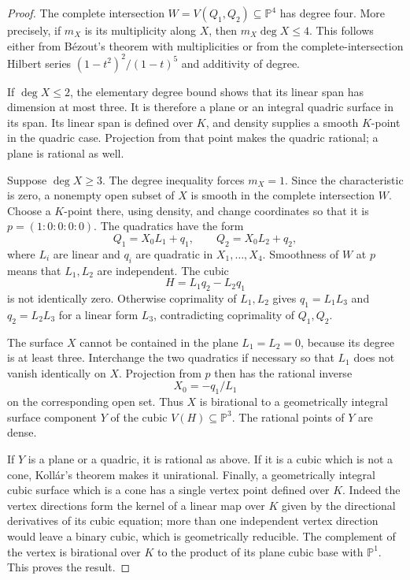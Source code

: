 \begin{proof}
The complete intersection $W=V(Q_1,Q_2)\subseteq\mathbb P^4$
has degree four.  More precisely, if $m_X$ is its multiplicity along
$X$, then $m_X\deg X\leq4$.  This follows either from B\'ezout's
theorem with multiplicities or from the complete-intersection Hilbert
series $(1-t^2)^2/(1-t)^5$ and additivity of degree.

If $\deg X\leq2$, the elementary degree bound shows that its linear
span has dimension at most three.  It is therefore a plane or an
integral quadric surface in its span.  Its linear span is defined over
$K$, and density supplies a smooth $K$-point in the quadric case.
Projection from that point makes the quadric rational; a plane is
rational as well.

Suppose $\deg X\geq3$.  The degree inequality forces $m_X=1$.
Since the characteristic is zero, a nonempty open subset of $X$ is
smooth in the complete intersection $W$.  Choose a $K$-point there,
using density, and change coordinates so that it is
$p=(1:0:0:0:0)$.  The quadratics have the form
\[
 Q_1=X_0L_1+q_1,\qquad Q_2=X_0L_2+q_2,
\]
where $L_i$ are linear and $q_i$ are quadratic in $X_1,\ldots,X_4$.
Smoothness of $W$ at $p$ means that $L_1,L_2$ are independent.
The cubic
\[
 H=L_1q_2-L_2q_1
\]
is not identically zero.  Otherwise coprimality of $L_1,L_2$ gives
$q_1=L_1L_3$ and $q_2=L_2L_3$ for a linear form $L_3$, contradicting
coprimality of $Q_1,Q_2$.

The surface $X$ cannot be contained in the plane $L_1=L_2=0$,
because its degree is at least three.  Interchange the two quadratics
if necessary so that $L_1$ does not vanish identically on $X$.
Projection from $p$ then has the rational inverse
\[
 X_0=-q_1/L_1
\]
on the corresponding open set.  Thus $X$ is birational to a
geometrically integral surface component $Y$ of the cubic
$V(H)\subseteq\mathbb P^3$.  The rational points of $Y$ are dense.

If $Y$ is a plane or a quadric, it is rational as above.  If it is
a cubic which is not a cone, Koll\'ar's theorem makes it unirational.
Finally, a geometrically integral cubic surface which is a cone has
a single vertex point defined over $K$.  Indeed the vertex directions
form the kernel of a linear map over $K$ given by the directional
derivatives of its cubic equation; more than one independent vertex
direction would leave a binary cubic, which is geometrically reducible.
The complement of the vertex is birational over $K$ to the product
of its plane cubic base with $\mathbb P^1$.  This proves the result.
\end{proof}

